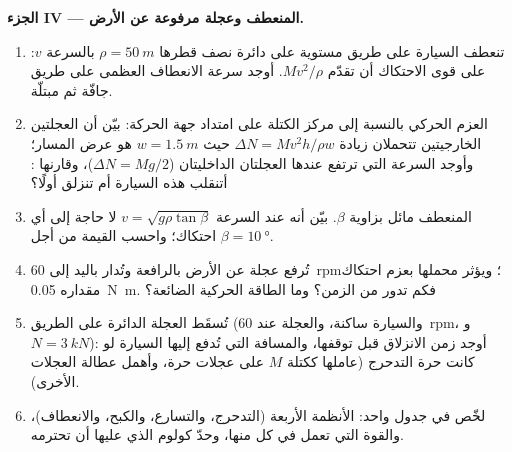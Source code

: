 \begin{problem}
\medskip
\noindent\textbf{الجزء IV --- المنعطف وعجلة مرفوعة عن الأرض.}
\begin{enumerate}[resume]
  \item تنعطف السيارة على طريق مستوية على دائرة نصف قطرها
        $\rho = \qty{50}{m}$ بالسرعة $v$: على قوى الاحتكاك أن تقدّم
        $Mv^2/\rho$. أوجد سرعة الانعطاف العظمى على طريق جافّة ثم مبتلّة.
  \item العزم الحركي بالنسبة إلى مركز الكتلة على امتداد جهة
        الحركة: بيّن أن العجلتين الخارجيتين تتحملان زيادة $\Delta N =
        Mv^2h/\rho w$ حيث $w = \qty{1.5}{m}$ هو عرض المسار؛ وأوجد
        السرعة التي ترتفع عندها العجلتان الداخليتان ($\Delta N = Mg/2$)،
        وقارنها : أتنقلب هذه السيارة أم تنزلق أولًا؟
  \item المنعطف مائل بزاوية $\beta$. بيّن أنه عند السرعة
        $v = \sqrt{g\rho\tan\beta}$ لا حاجة إلى أي احتكاك؛ واحسب
        القيمة من أجل $\beta = \qty{10}{\degree}$.
  \item تُرفع عجلة عن الأرض بالرافعة وتُدار باليد إلى
        \qty{60}{rpm}؛ ويؤثر محملها بعزم احتكاك مقداره
        \qty{0.05}{N.m}. فكم تدور من الزمن؟ وما الطاقة الحركية الضائعة؟
  \item تُسقَط العجلة الدائرة على الطريق (والسيارة ساكنة، والعجلة
        عند \qty{60}{rpm}، و $N = \qty{3}{kN}$): أوجد زمن الانزلاق قبل
        توقفها، والمسافة التي تُدفع إليها السيارة لو كانت حرة
        التدحرج (عاملها ككتلة $M$ على عجلات حرة، وأهمل عطالة
        العجلات الأخرى).
  \item لخّص في جدول واحد: الأنظمة الأربعة (التدحرج، والتسارع،
        والكبح، والانعطاف)، والقوة التي تعمل في كل منها، وحدّ
        كولوم الذي عليها أن تحترمه.
\end{enumerate}
\end{problem}
